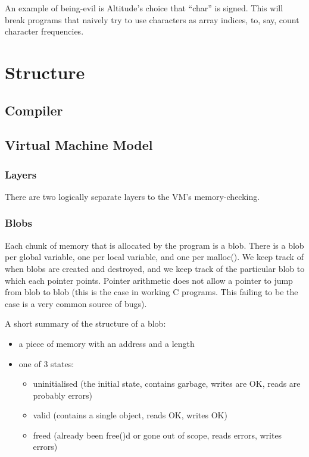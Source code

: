 \documentclass[a4paper]{report}
\begin{document}
An example of being-evil is Altitude's choice that ``char'' is signed. This will break programs that naively try to use characters as array indices, to, say, count character frequencies.


\section{Structure}
\subsection{Compiler}
\subsection{Virtual Machine Model}
\subsubsection{Layers}
There are two logically separate layers to the VM's memory-checking.
\subsubsection{Blobs}
Each chunk of memory that is allocated by the program is a blob. There is a blob per global variable, one per local variable, and one per malloc(). We keep track of when blobs are created and destroyed, and we keep track of the particular blob to which each pointer points. Pointer arithmetic does not allow a pointer to jump from blob to blob (this is the case in working C programs. This failing to be the case is a very common source of bugs).
\par
A short summary of the structure of a blob:
\begin{itemize}
\item a piece of memory with an address and a length
\item one of 3 states:
  \begin{itemize}
  \item uninitialised (the initial state, contains garbage, writes are OK, reads are probably errors)
  \item valid (contains a single object, reads OK, writes OK)
  \item freed (already been free()d or gone out of scope, reads errors, writes errors) 
  \end{itemize}
\end{itemize}
\end{document}
